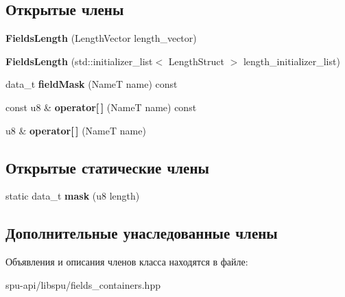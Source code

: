 \subsection*{Открытые члены}
\begin{DoxyCompactItemize}
\item 
\mbox{\label{class_s_p_u_1_1_fields_length_a6c872b2d70d351407f6c935a3f1054c3}} 
{\bfseries Fields\+Length} (Length\+Vector length\+\_\+vector)
\item 
\mbox{\label{class_s_p_u_1_1_fields_length_a448add7e3c528c6f19cd55d5923b9235}} 
{\bfseries Fields\+Length} (std\+::initializer\+\_\+list$<$ Length\+Struct $>$ length\+\_\+initializer\+\_\+list)
\item 
\mbox{\label{class_s_p_u_1_1_fields_length_a33dbec3b34b475fcf1afaba4155e3bf0}} 
data\+\_\+t {\bfseries field\+Mask} (NameT name) const
\item 
\mbox{\label{class_s_p_u_1_1_fields_length_a5dd2589e4576c96761f179b43f30869c}} 
const u8 \& {\bfseries operator\mbox{[}$\,$\mbox{]}} (NameT name) const
\item 
\mbox{\label{class_s_p_u_1_1_fields_length_a0fec8a15a660459656f4992ef56a03fe}} 
u8 \& {\bfseries operator\mbox{[}$\,$\mbox{]}} (NameT name)
\end{DoxyCompactItemize}
\subsection*{Открытые статические члены}
\begin{DoxyCompactItemize}
\item 
\mbox{\label{class_s_p_u_1_1_fields_length_a00ee369bbe966a9274289196e1d382b8}} 
static data\+\_\+t {\bfseries mask} (u8 length)
\end{DoxyCompactItemize}
\subsection*{Дополнительные унаследованные члены}


Объявления и описания членов класса находятся в файле\+:\begin{DoxyCompactItemize}
\item 
spu-\/api/libspu/fields\+\_\+containers.\+hpp\end{DoxyCompactItemize}
